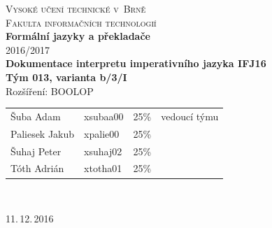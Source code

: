 \documentclass[a4paper, 11pt]{article}
\begin{document}
    \begin{titlepage}
        \begin{center}
        \textsc{{\LARGE Vysoké učení technické v~Brně\\[0.3em]
        Fakulta informačních technologií}}\\
        {\Huge \textbf{Formální jazyky a překladače}\\2016/2017}\\[1em]
        {\LARGE \textbf{Dokumentace interpretu imperativního jazyka IFJ16}}\\[0.5em]
        {\Large \textbf{Tým 013, varianta b/3/I}\\[0.3em]Rozšíření: BOOLOP}
        \end{center}
        {\large
        \begin{tabular}{l l l l}
            Šuba Adam & xsubaa00 & 25\% & vedoucí týmu\\
            Paliesek Jakub & xpalie00 & 25\% &\\
            Šuhaj Peter & xsuhaj02 & 25\% &\\
            Tóth Adrián & xtotha01 & 25\% &\\
        \end{tabular}}
        \\
        \begin{flushright}
        11.\,12.\,2016
        \end{flushright}
    \end{titlepage}

    \tableofcontents\newpage
\end{document}
